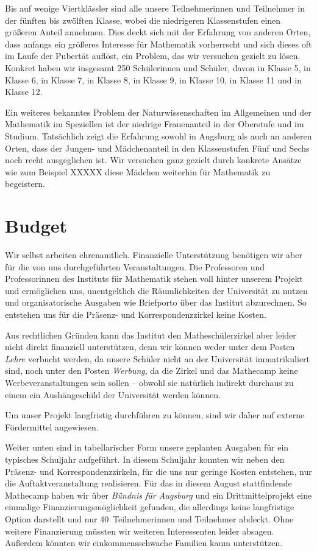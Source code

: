 \documentclass[12pt]{zettel}
\begin{document}
Bis auf wenige Viertklässler sind alle unsere Teilnehmerinnen und
Teilnehmer in der fünften bis zwölften Klasse, wobei die niedrigeren
Klassenstufen einen größeren Anteil annehmen. Dies deckt sich mit der
Erfahrung von anderen Orten, dass anfangs ein größeres Interesse für
Mathematik vorherrscht und sich dieses oft im Laufe der Pubertät
auflöst, ein Problem, das wir versuchen gezielt zu lösen. Konkret haben
wir insgesamt 250 Schülerinnen und Schüler, davon in Klasse 5, in Klasse
6, in Klasse 7, in Klasse 8, in Klasse 9, in Klasse 10, in Klasse 11 und
in Klasse 12.

Ein weiteres bekanntes Problem der Naturwissenschaften im Allgemeinen
und der Mathematik im Speziellen ist der niedrige Frauenanteil in der
Oberstufe und im Studium. Tatsächlich zeigt die Erfahrung sowohl in
Augsburg als auch an anderen Orten, dass der Jungen- und Mädchenanteil
in den Klassenstufen Fünf und Sechs noch recht ausgeglichen ist. Wir
versuchen ganz gezielt durch konkrete Ansätze wie zum Beispiel XXXXX
diese Mädchen weiterhin für Mathematik zu begeistern.


\section{Budget}

Wir selbst arbeiten ehrenamtlich. Finanzielle Unterstützung benötigen wir aber
für die von uns durchgeführten Veranstaltungen. Die Professoren und
Professorinnen des Instituts für Mathematik stehen voll hinter unserem Projekt
und ermöglichen uns, unentgeltlich die Räumlichkeiten der Universität zu nutzen
und organisatorische Ausgaben wie Briefporto über das Institut abzurechnen.
So entstehen uns für die Präsenz- und Korrespondenzzirkel keine Kosten.

Aus rechtlichen Gründen kann das Institut den Matheschülerzirkel aber leider nicht
direkt finanziell unterstützen, denn wir können weder unter dem Posten
\emph{Lehre} verbucht werden, da unsere Schüler nicht an der Universität
immatrikuliert sind, noch unter den Posten \emph{Werbung}, da die Zirkel und
das Mathecamp keine Werbeveranstaltungen sein sollen -- obwohl sie natürlich indirekt
durchaus zu einem ein Aushängeschild der Universität werden können.

Um unser Projekt langfristig durchführen zu können, sind wir daher auf externe
Fördermittel angewiesen.

Weiter unten sind in tabellarischer Form unsere geplanten Ausgaben für ein
typisches Schuljahr aufgeführt. In diesem Schuljahr konnten wir
neben den Präsenz- und Korrespondenzzirkeln, für die uns nur geringe Kosten
entstehen, nur die Auftaktveranstaltung realisieren. Für das in diesem August
stattfindende Mathecamp haben wir über \emph{Bündnis für Augsburg} und ein
Drittmittelprojekt eine einmalige Finanzierungsmöglichkeit gefunden, die
allerdings keine langfristige Option darstellt und nur 40~Teilnehmerinnen und
Teilnehmer abdeckt. Ohne weitere Finanzierung müssten wir weiteren
Interessenten leider absagen. Außerdem könnten wir einkommensschwache Familien
kaum unterstützen.
\end{document}
